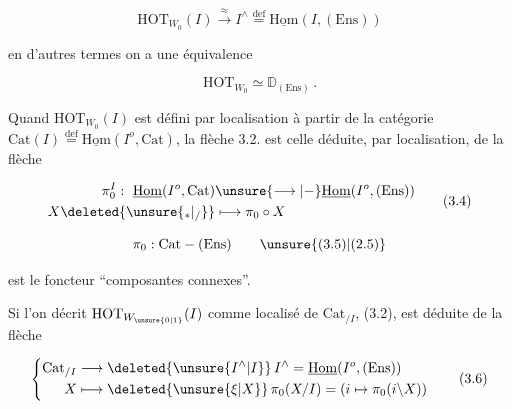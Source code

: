 \[
\mathrm{HOT}_{W_0}(I)\xrightarrow{\approx}I^\wedge\overset{\mathrm{def}}{=}\underline{\mathrm{Hom}}(I,(\mathrm{Ens}))\tag*{(3.2.)}
\]

en d'autres termes on a une équivalence

\[
\mathrm{HOT}_{W_0}\simeq\mathbb D_{(\mathrm{Ens})}\,.\tag*{(3.3.)}
\]

Quand $\mathrm{HOT}_{W_0}(I)$ est défini par localisation à partir de la catégorie $\mathrm{Cat}(I)\overset{\mathrm{def}}{=}\underline{\mathrm{Hom}}(I^o,\mathrm{Cat})$, la flèche 3.2. est celle déduite, par localisation, de la flèche

\[
\begin{aligned}
\pi_0^I:\ \underline{\mathrm{Hom}}(I^o,\mathrm{Cat})&\unsure{\longrightarrow|\mathbin{-}}\underline{\mathrm{Hom}}(I^o,(\mathrm{Ens}))\\
X\deleted{\unsure{_{*}|_{/}}}&\longmapsto\pi_0\circ X
\end{aligned}\tag*{(3.4)}
\]

\deleted{\unsure{$\pi$}}

\[
\pi_0:\mathrm{Cat}\mathbin{-}(\mathrm{Ens})\tag*{\unsure{(3.5)|(2.5)}}
\]

est le foncteur ``composantes connexes''.

Si l'on décrit $\mathrm{HOT}_{W_{\unsure{0|1}}}(I)$ comme localisé de $\mathrm{Cat}_{/I}$, (3.2), est déduite de la flèche

\[
\left\{\begin{aligned}
\mathrm{Cat}_{/I}&\longrightarrow\deleted{\unsure{I^\wedge|I}}\,I^\wedge=\underline{\mathrm{Hom}}(I^o,(\mathrm{Ens}))\\
X&\longmapsto\deleted{\unsure{\xi|X}}\,\pi_0(X/I)=(i\mapsto\pi_0(i\backslash X))\end{aligned}\right.\tag*{(3.6)}
\]

